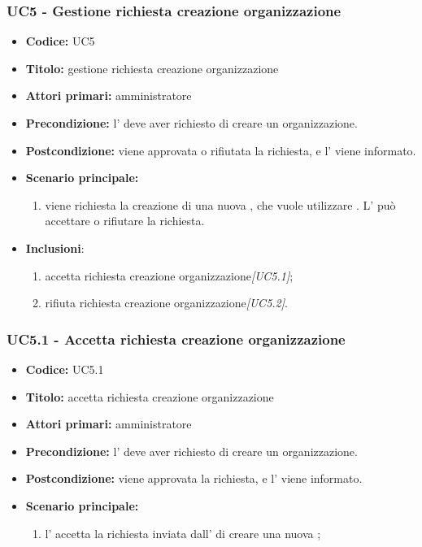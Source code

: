 \documentclass[casi-duso]{subfiles}
\begin{document}
\subsubsection{UC5 - Gestione richiesta creazione organizzazione}
\label{subsub:UC5}
\begin{itemize}
  \item \textbf{Codice:} UC5
  \item \textbf{Titolo:} gestione richiesta creazione organizzazione
  \item \textbf{Attori primari:} amministratore
  \item \textbf{Precondizione:} l' deve aver richiesto di creare un organizzazione.
  \item \textbf{Postcondizione:} viene approvata o rifiutata la richiesta, e l' viene informato.
  \item \textbf{Scenario principale:} 
  \begin{enumerate}
    \item viene richiesta la creazione di una nuova , che vuole utilizzare . L' può accettare o rifiutare la richiesta.
  \end{enumerate}
  \item \textbf{Inclusioni}:
  \begin{enumerate}
    \item accetta richiesta creazione organizzazione\emph{[UC5.1]};
    \item rifiuta richiesta creazione organizzazione\emph{[UC5.2]}.
  \end{enumerate}
\end{itemize}

\subsubsection{UC5.1 - Accetta richiesta creazione organizzazione}
\label{subsub:UC5.1}
\begin{itemize}
  \item \textbf{Codice:} UC5.1
  \item \textbf{Titolo:} accetta richiesta creazione organizzazione
  \item \textbf{Attori primari:} amministratore
  \item \textbf{Precondizione:} l' deve aver richiesto di creare un organizzazione.
  \item \textbf{Postcondizione:} viene approvata la richiesta, e l' viene informato.
  \item \textbf{Scenario principale:} 
  \begin{enumerate}
    \item  l' accetta la richiesta inviata dall' di creare una nuova ;
  \end{enumerate}
\end{itemize}
\end{document}
